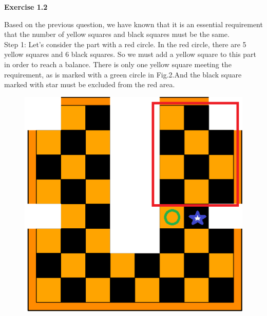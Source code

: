 \documentclass{article} %
\begin{document}
	\textbf{Exercise 1.2}\par
	Based on the previous question, we have known that it is an essential requirement that the number of yellow squares and black squares must be the same.\\
	Step 1: Let's consider the part with a red circle. In the red circle, there are 5 yellow squares and 6 black squares. So we must add a yellow square to this part in order to reach a balance. There is only one yellow square meeting the requirement, as is marked with a green circle in Fig.2.And the black square marked with star must be excluded from the red area.\\
	\begin{figure}[H]
		\centering
		\includegraphics[scale=0.6]{f1.png}
		\caption{}
		\label{fig:2}
	\end{figure}
	
\end{document}
